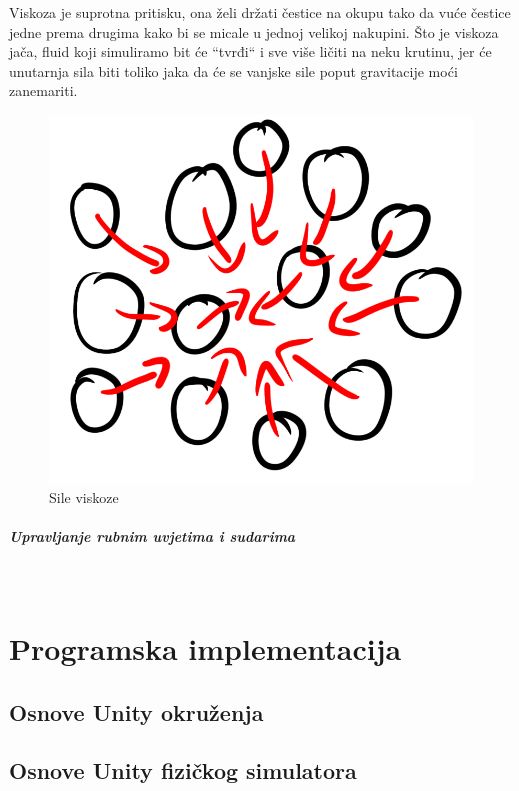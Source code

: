 \documentclass[diplomskirad]{fer}
\newcommand{\paragraphnewline}[1]{\paragraph{#1}\mbox{}\\}
\begin{document}
    Viskoza je suprotna pritisku, ona želi držati čestice na okupu tako da vuće čestice jedne prema drugima kako bi se micale u jednoj velikoj nakupini.
    Što je viskoza jača, fluid koji simuliramo bit će ``tvrđi`` i sve više ličiti na neku krutinu, jer će unutarnja sila biti toliko jaka da će se vanjske sile
    poput gravitacije moći zanemariti.
    \begin{figure}[H]
        \centering
        \includegraphics[scale=1]{images/viscoseForce}
        \caption{
            Sile viskoze
        }
        \label{fig:viscoseForce}
    \end{figure}



    \paragraphnewline{Upravljanje rubnim uvjetima i sudarima}


    \chapter{Programska implementacija}\label{ch:programska-implementacija}

    \section{Osnove Unity okruženja}\label{sec:osnove-unity-okruzenja}
    \section{Osnove Unity fizičkog simulatora}\label{sec:osnove-unity-fizickog-simulatora}
\end{document}

